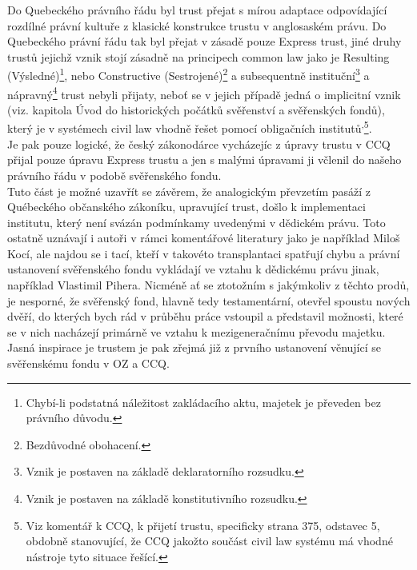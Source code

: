 \documentclass{article}
\begin{document}
Do Quebeckého právního řádu byl trust přejat s mírou adaptace odpovídající rozdílné právní kultuře z klasické konstrukce trustu v anglosaském právu. Do Quebeckého právní řádu tak byl přejat v zásadě pouze Express trust, jiné druhy trustů jejichž vznik stojí zásadně na principech common law jako je Resulting (Výsledné)\footnote{Chybí-li podstatná náležitost zakládacího aktu, majetek je převeden bez právního důvodu.}, nebo Constructive (Sestrojené)\footnote{Bezdůvodné obohacení.} a subsequentně instituční\footnote{Vznik je postaven na základě deklaratorního rozsudku.} a nápravný\footnote{Vznik je postaven na základě konstitutivního rozsudku.} trust nebyli přijaty, neboť se v jejich případě jedná o implicitní vznik (viz. kapitola Úvod do historických počátků svěřenství a svěřenských fondů), který je v systémech civil law vhodně řešet pomocí obligačních institutů\textsuperscript{,}\footnote{Viz komentář k CCQ, k přijetí trustu, specificky strana 375, odstavec 5, obdobně stanovující, že CCQ jakožto součást civil law systému má vhodné nástroje tyto situace řešící.}.\\

Je pak pouze logické, že český zákonodárce vycházejíc z úpravy trustu v CCQ přijal pouze úpravu Express trustu a jen s malými úpravami ji včlenil do našeho právního řádu v podobě svěřenského fondu.\\

Tuto část je možné uzavřít se závěrem, že analogickým převzetím pasáží z Québeckého občanského zákoníku, upravující trust, došlo k implementaci institutu, který není svázán podmínkamy uvedenými v dědickém právu. Toto ostatně uznávají i autoři v rámci komentářové literatury jako je například Miloš Kocí, ale najdou se i tací, kteří v takovéto transplantaci spatřují chybu a právní ustanovení svěřenského fondu vykládají ve vztahu k dědickému právu jinak, například Vlastimil Pihera. Nicméně ať se ztotožním s jakýmkoliv z těchto prodů, je nesporné, že svěřenský fond, hlavně tedy testamentární, otevřel spoustu nových dvěří, do kterých bych rád v průběhu práce vstoupil a představil možnosti, které se v nich nacházejí primárně ve vztahu k mezigeneračnímu převodu majetku.\\

Jasná inspirace je trustem je pak zřejmá již z prvního ustanovení věnující se svěřenskému fondu v OZ a CCQ.\\
\end{document}
